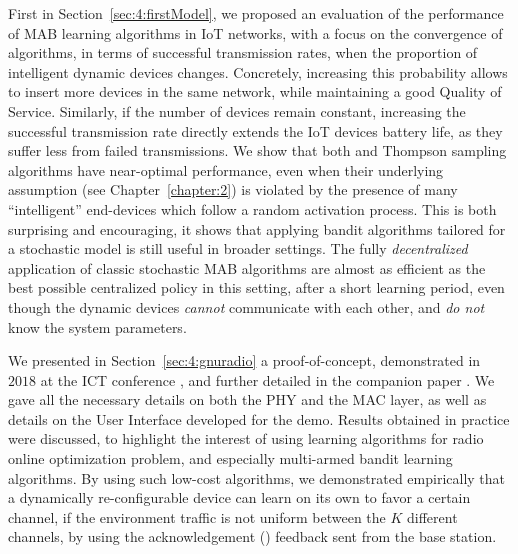 First in Section~\ref{sec:4:firstModel}, we proposed an evaluation of the performance of MAB learning algorithms in IoT networks,
with a focus on the convergence of algorithms, in terms of successful transmission rates, when the proportion of intelligent dynamic devices changes.
Concretely, increasing this probability allows to insert more devices in the same network, while maintaining a good Quality of Service.
Similarly, if the number of devices remain constant, increasing the successful transmission rate directly extends the IoT devices battery life, as they suffer less from failed transmissions.
We show that both \UCB{} and Thompson sampling algorithms have near-optimal performance, even when their underlying \iid{} assumption (see Chapter~\ref{chapter:2}) is violated by the presence of many ``intelligent'' end-devices which follow a random activation process.
%
This is both surprising and encouraging, it shows that applying bandit algorithms tailored for a stochastic model is still useful in broader settings.
The fully \emph{decentralized} application of classic stochastic MAB algorithms are almost as efficient as the best possible centralized policy in this setting, after a short learning period, even though the dynamic devices \emph{cannot} communicate with each other, and \emph{do not} know the system parameters.


We presented in Section~\ref{sec:4:gnuradio} a proof-of-concept, demonstrated in $2018$ at the ICT conference \cite{Besson2018ICT}, and further detailed in the companion paper \cite{Besson2019WCNC}.
We gave all the necessary details on both the PHY and the MAC layer, as well as details on the User Interface developed for the demo.
Results obtained in practice were discussed, to highlight the interest of using learning algorithms for radio online optimization problem, and especially multi-armed bandit learning algorithms.
%
By using such low-cost algorithms, we demonstrated empirically that a dynamically re-configurable device can learn on its own to favor a certain channel, if the environment traffic is not uniform between the $K$ different channels, by using the acknowledgement (\Ack) feedback sent from the base station.


